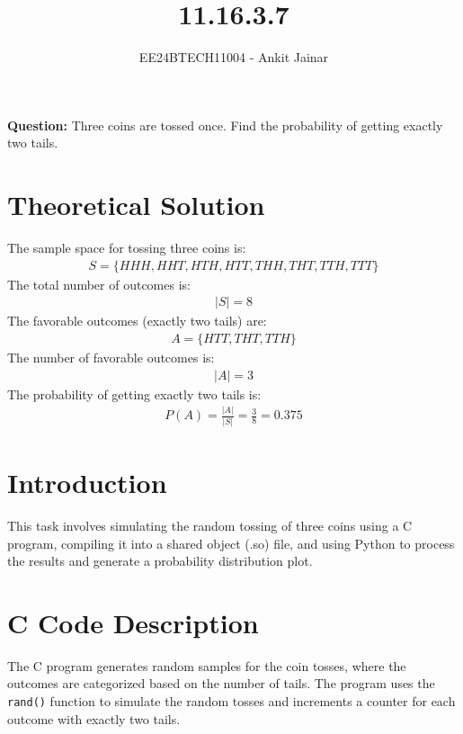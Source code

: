 \documentclass[journal]{IEEEtran}
\begin{document}
\title{11.16.3.7}
\author{EE24BTECH11004 - Ankit Jainar}
\maketitle

\textbf{Question:}
Three coins are tossed once. Find the probability of getting exactly two tails.

\section*{Theoretical Solution}
The sample space for tossing three coins is:
\begin{align}
    S = \{HHH, HHT, HTH, HTT, THH, THT, TTH, TTT\}
\end{align}
The total number of outcomes is:
\begin{align}
    |S| = 8
\end{align}
The favorable outcomes (exactly two tails) are:
\begin{align}
    A = \{HTT, THT, TTH\}
\end{align}
The number of favorable outcomes is:
\begin{align}
    |A| = 3
\end{align}
The probability of getting exactly two tails is:
\begin{align}
    P(A) = \frac{|A|}{|S|} = \frac{3}{8} = 0.375
\end{align}

\section*{Introduction}
This task involves simulating the random tossing of three coins using a C program, compiling it into a shared object (.so) file, and using Python to process the results and generate a probability distribution plot.

\section*{C Code Description}
The C program generates random samples for the coin tosses, where the outcomes are categorized based on the number of tails. The program uses the \texttt{rand()} function to simulate the random tosses and increments a counter for each outcome with exactly two tails.
\end{document}
